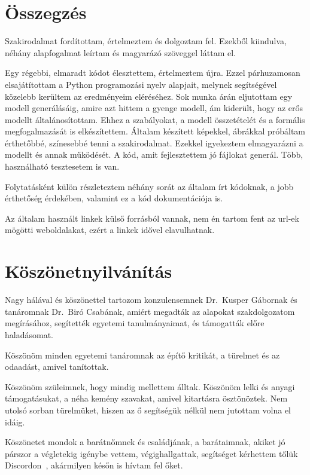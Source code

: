 \documentclass[
]{thesis-ekf}
\theoremstyle{definition}
\theoremstyle{remark}
\begin{document}
\chapter*{Összegzés}
	Szakirodalmat fordítottam, értelmeztem és dolgoztam fel.
	Ezekből kiindulva, néhány alapfogalmat leírtam és magyarázó szöveggel láttam el.


	Egy régebbi, elmaradt kódot élesztettem, értelmeztem újra.
	Ezzel párhuzamosan elsajátítottam a Python programozási nyelv alapjait, melynek segítségével közelebb kerültem az eredményeim eléréséhez.
	Sok munka árán eljutottam egy modell generálásáig, amire azt hittem a gyenge modell, ám kiderült, hogy az erős modellt általánosítottam.
	Ehhez a szabályokat, a modell összetételét és a formális megfogalmazását is elkészítettem.
	Általam készített képekkel, ábrákkal próbáltam érthetőbbé, színesebbé tenni a szakirodalmat.
	Ezekkel igyekeztem elmagyarázni a modellt és annak működését.
	A kód, amit fejlesztettem jó fájlokat generál. Több, használható tesztesetem is van.
	
	Folytatásként külön részleteztem néhány sorát az általam írt kódoknak, a jobb érthetőség érdekében, valamint ez a kód dokumentációja is.

	Az általam használt linkek külső forrásból vannak, nem én tartom fent az url-ek mögötti weboldalakat, ezért a linkek idővel elavulhatnak.
	
\chapter*{Köszönetnyilvánítás}

	Nagy hálával és köszönettel tartozom konzulensemnek Dr.~Kusper Gábornak és tanáromnak Dr.~Biró Csabának, amiért megadták az alapokat szakdolgozatom megírásához, segítették egyetemi tanulmányaimat, és támogatták előre haladásomat.

	Köszönöm minden egyetemi tanáromnak az építő kritikát, a türelmet és az odaadást, amivel tanítottak.
	
	Köszönöm szüleimnek, hogy mindig mellettem álltak. Köszönöm lelki és anyagi támogatásukat, a néha kemény szavakat, amivel kitartásra ösztönöztek. Nem utolsó sorban türelmüket, hiszen az ő segítségük nélkül nem jutottam volna el idáig.
	
	Köszönetet mondok a barátnőmnek és családjának, a barátaimnak, akiket jó párszor a végletekig igénybe vettem, végighallgattak, segítséget kérhettem tőlük Discordon~\cite{dc}, akármilyen későn is hívtam fel őket.
	
\end{document}
